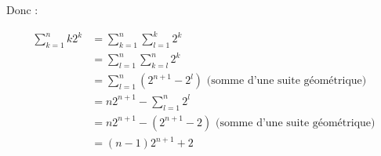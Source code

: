 \documentclass{report}
\begin{document}
Donc :

\begin{equation*}
	\begin{split}
		\sum_{k=1}^{n} k2^k
			&= \sum_{k=1}^{n}\sum_{l=1}^{k} 2^k\\
			&= \sum_{l=1}^{n}\sum_{k=l}^{n} 2^k\\
			&= \sum_{l=1}^{n} \left(2^{n+1} - 2^l\right) \text{ (somme d'une suite géométrique)}\\
			&= n 2^{n+1} - \sum_{l=1}^{n} 2^l \\
			&= n 2^{n+1} - (2^{n+1}-2)  \text{ (somme d'une suite géométrique)}\\
			&= (n-1)2^{n+1} +2
	\end{split}
\end{equation*}
\end{document}
